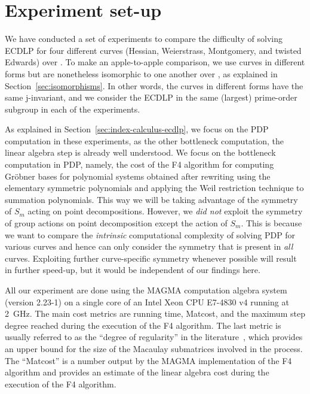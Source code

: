 \section{Experiment set-up}
\label{sec:experiment-setup}

We have conducted a set of experiments to compare the difficulty of
solving ECDLP for four different curves (Hessian, Weierstrass,
Montgomery, and twisted Edwards) over .
%
To make an apple-to-apple comparison, we use curves in different forms
but are nonetheless isomorphic to one another over , as
explained in Section~\ref{sec:isomorphisms}.
%
In other words, the curves in different forms have the same
j-invariant, and we consider the ECDLP in the same (largest)
prime-order subgroup in each of the experiments.

As explained in Section~\ref{sec:index-calculus-ecdlp}, we focus on
the PDP computation in these experiments, as the other bottleneck
computation, the linear algebra step is already well understood.
%
We focus on the bottleneck computation in PDP, namely, the cost of the
F4 algorithm for computing Gr\"obner bases for polynomial systems
obtained after rewriting using the elementary symmetric polynomials
and applying the Weil restriction technique to summation polynomials.
%
This way we will be taking advantage of the symmetry of $S_m$ acting
on point decompositions.
% 
However, we \emph{did not} exploit the symmetry of group actions on
point decomposition except the action of $S_m$.
%
This is because we want to compare the \emph{intrinsic} computational
complexity of solving PDP for various curves and hence can only
consider the symmetry that is present in \emph{all} curves.
%
Exploiting further curve-specific symmetry whenever possible will
result in further speed-up, but it would be independent of our
findings here.

All our experiment are done using the MAGMA computation algebra system
(version 2.23-1) on a single core of an Intel Xeon CPU E7-4830 v4
running at 2~GHz.
%
The main cost metrics are running time, Matcost, and the maximum step
degree reached during the execution of the F4 algorithm.
%
The last metric is usually referred to as the ``degree of regularity''
in the literature~\cite{DBLP:conf/indocrypt/GalbraithG14}, which
provides an upper bound for the size of the Macaulay submatrices
involved in the process.
%
The ``Matcost'' is a number output by the MAGMA implementation of the
F4 algorithm and provides an estimate of the linear algebra cost
during the execution of the F4 algorithm.

